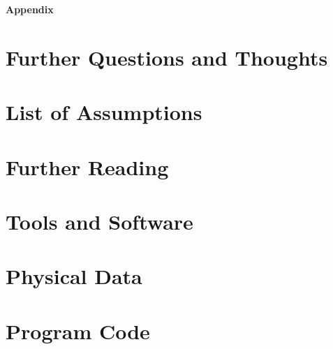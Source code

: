 \documentclass[12pt,draft]{article}
\begin{document}
\appendix

\huge\textbf{Appendix}

\section{Further Questions and Thoughts}



\section{List of Assumptions}

\section{Further Reading}

\section{Tools and Software}

\section{Physical Data}

\section{Program Code}
\end{document}
